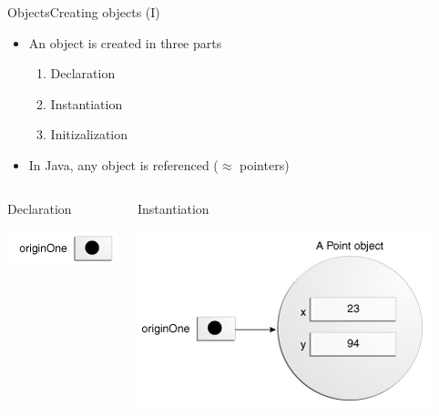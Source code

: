 \documentclass[10pt,compress]{beamer} %
\begin{document}
\begin{frame}{Objects}{Creating objects (I)}
	\vspace{-0.4cm}
	\begin{itemize}
	\item An object is created in three parts
		\begin{enumerate}
		\item Declaration
		\item Instantiation
		\item Initizalization
		\end{enumerate}
	\item In Java, any object is \alert{referenced} ($\approx$ pointers)
	\end{itemize}

    \begin{columns}
	\vspace{-0.2cm}
	\begin{block}{Declaration}
	\vspace{-0.2cm}
		
		\vspace{-0.2cm}
		\centering \includegraphics[width=0.7\linewidth]{figs/objects-null.png}
	\end{block}

	\vspace{-0.2cm}
	\begin{block}{Instantiation}
	\vspace{-0.2cm}
		
		\vspace{-0.2cm}
		\centering \includegraphics[width=0.6\linewidth]{figs/objects-oneRef.png}
	\end{block}
	\end{columns}
\end{frame}
\end{document}
